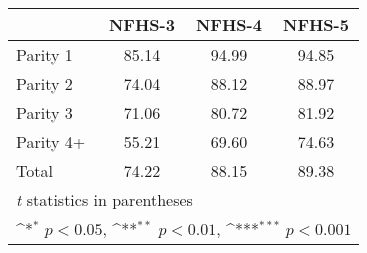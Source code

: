 {
\def\sym#1{\ifmmode^{#1}\else\(^{#1}\)\fi}
\begin{tabular}{l*{3}{c}}
\toprule
            &\multicolumn{1}{c}{NFHS-3}&\multicolumn{1}{c}{NFHS-4}&\multicolumn{1}{c}{NFHS-5}\\
\midrule
\midrule
Parity 1    &       85.14         &       94.99         &       94.85         \\
Parity 2    &       74.04         &       88.12         &       88.97         \\
Parity 3    &       71.06         &       80.72         &       81.92         \\
Parity 4+   &       55.21         &       69.60         &       74.63         \\
Total       &       74.22         &       88.15         &       89.38         \\
\bottomrule
\multicolumn{4}{l}{\footnotesize \textit{t} statistics in parentheses}\\
\multicolumn{4}{l}{\footnotesize \sym{*} \(p<0.05\), \sym{**} \(p<0.01\), \sym{***} \(p<0.001\)}\\
\end{tabular}
}
